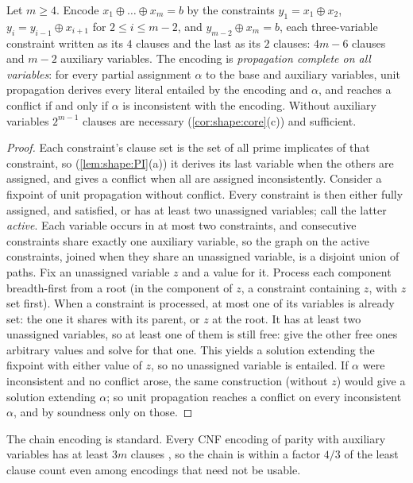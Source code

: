 \begin{proposition}\label{prop:shape:chainenc}
Let $m\ge4$. Encode $x_1\oplus\dots\oplus x_m=b$ by the constraints $y_1=x_1\oplus x_2$, $y_i=y_{i-1}\oplus x_{i+1}$ for $2\le i\le m-2$, and $y_{m-2}\oplus x_m=b$, each three-variable constraint written as its $4$ clauses and the last as its $2$ clauses: $4m-6$ clauses and $m-2$ auxiliary variables. The encoding is \emph{propagation complete on all variables}: for every partial assignment $\alpha$ to the base and auxiliary variables, unit propagation derives every literal entailed by the encoding and $\alpha$, and reaches a conflict if and only if $\alpha$ is inconsistent with the encoding. Without auxiliary variables $2^{m-1}$ clauses are necessary (\cref{cor:shape:core}(c)) and sufficient.
\end{proposition}

\begin{proof}
Each constraint's clause set is the set of all prime implicates of that constraint, so (\cref{lem:shape:PI}(a)) it derives its last variable when the others are assigned, and gives a conflict when all are assigned inconsistently. Consider a fixpoint of unit propagation without conflict. Every constraint is then either fully assigned, and satisfied, or has at least two unassigned variables; call the latter \emph{active}. Each variable occurs in at most two constraints, and consecutive constraints share exactly one auxiliary variable, so the graph on the active constraints, joined when they share an unassigned variable, is a disjoint union of paths. Fix an unassigned variable $z$ and a value for it. Process each component breadth-first from a root (in the component of $z$, a constraint containing $z$, with $z$ set first). When a constraint is processed, at most one of its variables is already set: the one it shares with its parent, or $z$ at the root. It has at least two unassigned variables, so at least one of them is still free: give the other free ones arbitrary values and solve for that one. This yields a solution extending the fixpoint with either value of $z$, so no unassigned variable is entailed. If $\alpha$ were inconsistent and no conflict arose, the same construction (without $z$) would give a solution extending $\alpha$; so unit propagation reaches a conflict on every inconsistent $\alpha$, and by soundness only on those.
\end{proof}

The chain encoding is standard. Every CNF encoding of parity with auxiliary variables has at least $3m$ clauses \citep{emdin2022cnf}, so the chain is within a factor $4/3$ of the least clause count even among encodings that need not be usable.


